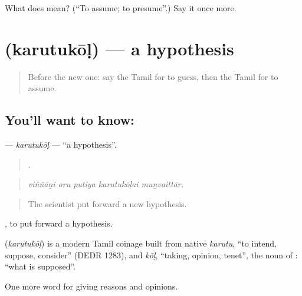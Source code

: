 \begin{tcolorbox}[breakable,colback=teal!4,colframe=teal!35!black,title={Before you move on}]
What does  mean? (\textquotedblleft{}To assume; to presume\textquotedblright{}.) Say it once more.
\end{tcolorbox}
\section[\texorpdfstring{\ta{கருதுகோள்} (karutukōḷ)}{கருதுகோள் (karutukōḷ)}]{ (karutukōḷ) — a hypothesis}

\label{lesson:TA-C349-karutukol}



\begin{quote}
Before the new one: say the Tamil for to guess, then the Tamil for to assume.
\end{quote}

\subsection*{You'll want to know: }
\textbf{} — \emph{karutukōḷ} — \textquotedblleft{}a hypothesis\textquotedblright{}.

\begin{quote}
    .
\end{quote}

\begin{quote}
\emph{viññāṉi oru putiya karutukōḷai muṉvaittār.}
\end{quote}

\begin{quote}
The scientist put forward a new hypothesis.
\end{quote}

 , to put forward a hypothesis.

\begin{cousinweb}
\textbf{} (\emph{karutukōḷ}) is a modern Tamil coinage built from native \emph{karutu}, \textquotedblleft{}to intend, suppose, consider\textquotedblright{} (DEDR 1283), and \emph{kōḷ}, \textquotedblleft{}taking, opinion, tenet\textquotedblright{}, the noun of : \textquotedblleft{}what is supposed\textquotedblright{}.
\end{cousinweb}

\begin{grammarlens}[title={What you've built}]
One more word for giving reasons and opinions.
\end{grammarlens}

